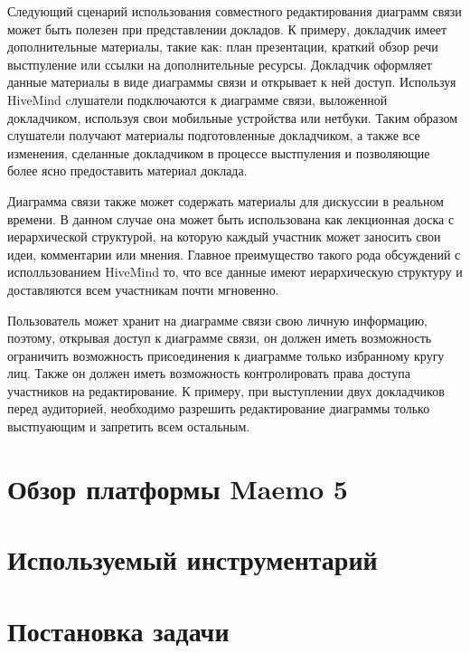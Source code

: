 Следующий сценарий использования совместного редактирования диаграмм связи может
быть полезен при представлении докладов. К примеру, докладчик имеет
дополнительные материалы, такие как: план презентации, краткий обзор речи
выстпуление или ссылки на дополнительные ресурсы. Докладчик оформляет данные
материалы в виде диаграммы связи и открывает к ней доступ. Используя HiveMind
cлушатели подключаются к диаграмме связи, выложенной докладчиком, используя свои
мобильные устройства или нетбуки. Таким образом слушатели получают материалы
подготовленные докладчиком, а также все изменения, сделанные докладчиком в
процессе выстпуления и позволяющие более ясно предоставить материал доклада.

Диаграмма связи также может содержать материалы для дискуссии в реальном
времени. В данном случае она может быть использована как лекционная доска с
иерархической структурой, на которую каждый участник может заносить свои идеи,
комментарии или мнения. Главное преимущество такого рода обсуждений с
исполльзованием HiveMind то, что все данные имеют иерархическую структуру и
доставляются всем участникам почти мгновенно.

Пользователь может хранит на диаграмме связи свою личную информацию, поэтому,
открывая доступ к диаграмме связи, он должен иметь возможность ограничить
возможность присоединения к диаграмме только избранному кругу лиц. Также он
должен иметь возможность контролировать права доступа участников на
редактирование. К примеру, при выступлении двух докладчиков перед аудиторией,
необходимо разрешить редактирование диаграммы только выстпуающим и
запретить всем остальным.


\section{Обзор платформы Maemo 5}\label{sec:compare_platforms}

\section{Используемый инструментарий}\label{sec:choose_toolkit}

\section{Постановка задачи}\label{sec:statement_task}
